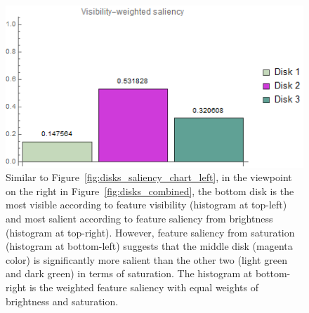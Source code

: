 \begin{figure}
\begin{minipage}{.45\textwidth}
	\end{minipage}~
	\begin{minipage}{.45\textwidth}
		\includegraphics[width=1\linewidth]{images/disk_visibility_saliency_weighted_chart_right.png}
	\end{minipage}
	\caption{Similar to Figure~\ref{fig:disks_saliency_chart_left}, in the viewpoint on the right in Figure~\ref{fig:disks_combined}, the bottom disk is the most visible according to feature visibility (histogram at top-left) and most salient according to feature saliency from brightness (histogram at top-right). However, feature saliency from saturation (histogram at bottom-left) suggests that the middle disk (magenta color) is significantly more salient than the other two (light green and dark green) in terms of saturation. The histogram at bottom-right is the weighted feature saliency with equal weights of brightness and saturation.}
	\label{fig:disks_saliency_chart_right}
\end{figure}


